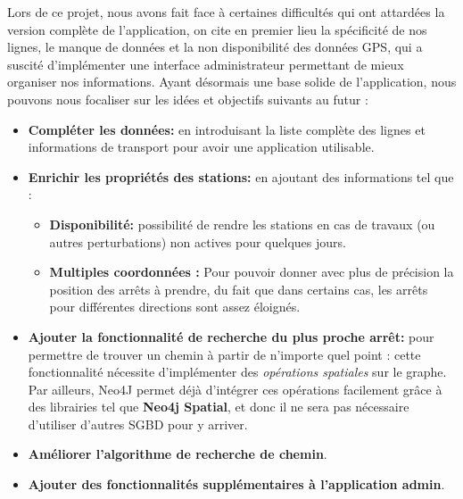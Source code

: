 Lors de ce projet, nous avons fait face à certaines difficultés qui ont attardées la version complète de l'application, on cite en premier lieu la spécificité de nos lignes, le manque de données et la non disponibilité des données GPS, qui a suscité d'implémenter une interface administrateur permettant de mieux organiser nos informations.\newline\newline
Ayant désormais une base solide de l'application, nous pouvons nous focaliser sur les idées et objectifs suivants au futur :
\begin{itemize}
	\item \textbf{Compléter les données:} en introduisant la liste complète des lignes et informations de transport pour avoir une application utilisable.
	
	\item \textbf{Enrichir les propriétés des stations: }en ajoutant des informations tel que :
		\begin{itemize}
			\item \textbf{Disponibilité:} possibilité de rendre les stations en cas de travaux (ou autres perturbations) non actives pour quelques jours.
			\item \textbf{Multiples coordonnées :} Pour pouvoir donner avec plus de précision la position des arrêts à prendre, du fait que dans certains cas, les arrêts pour différentes directions sont assez éloignés.
		\end{itemize}
		
	\item \textbf{Ajouter la fonctionnalité de recherche du plus proche arrêt: } pour permettre de trouver un chemin à partir de n'importe quel point : cette fonctionnalité nécessite d'implémenter des \emph{opérations spatiales} sur le graphe. Par ailleurs, Neo4J permet déjà d'intégrer ces opérations facilement grâce à des librairies tel que \textbf{Neo4j Spatial}, et donc il ne sera pas nécessaire d'utiliser d'autres SGBD pour y arriver.

	\item \textbf{Améliorer l'algorithme de recherche de chemin}.
	
	\item \textbf{Ajouter des fonctionnalités supplémentaires à l'application admin}.
	

\end{itemize}
